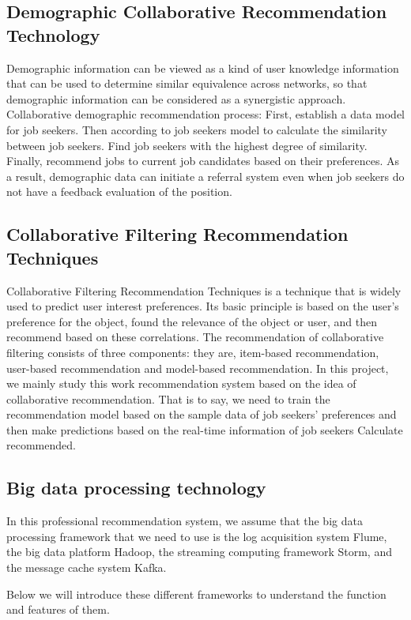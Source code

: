\documentclass[sigconf]{acmart}
\begin{document}
\subsection{Demographic Collaborative Recommendation Technology}
Demographic information can be viewed as a kind of user knowledge information that can be used to determine similar equivalence across networks, so that demographic information can be considered as a synergistic approach.\cite{Jain2016} Collaborative demographic recommendation process: First, establish a data model for job seekers. Then according to job seekers model to calculate the similarity between job seekers. Find job seekers with the highest degree of similarity. Finally, recommend jobs to current job candidates based on their preferences.\cite{Jain2016} As a result, demographic data can initiate a referral system even when job seekers do not have a feedback evaluation of the position.

\subsection{Collaborative Filtering Recommendation Techniques}
Collaborative Filtering Recommendation Techniques is a technique that is widely used to predict user interest preferences.\cite{CF2017} Its basic principle is based on the user's preference for the object, found the relevance of the object or user, and then recommend based on these correlations. The recommendation of collaborative filtering consists of three components: they are, item-based recommendation, user-based recommendation and model-based recommendation.\cite{CF2017}  In this project, we mainly study this work recommendation system based on the idea of collaborative recommendation. That is to say, we need to train the recommendation model based on the sample data of job seekers' preferences and then make predictions based on the real-time information of job seekers Calculate recommended.

\subsection{Big data processing technology}
In this professional recommendation system, we assume that the big data processing framework that we need to use is the log acquisition system Flume, the big data platform Hadoop, the streaming computing framework Storm, and the message cache system Kafka.

\par Below we will introduce these different frameworks to understand the function and features of them.
\end{document}

